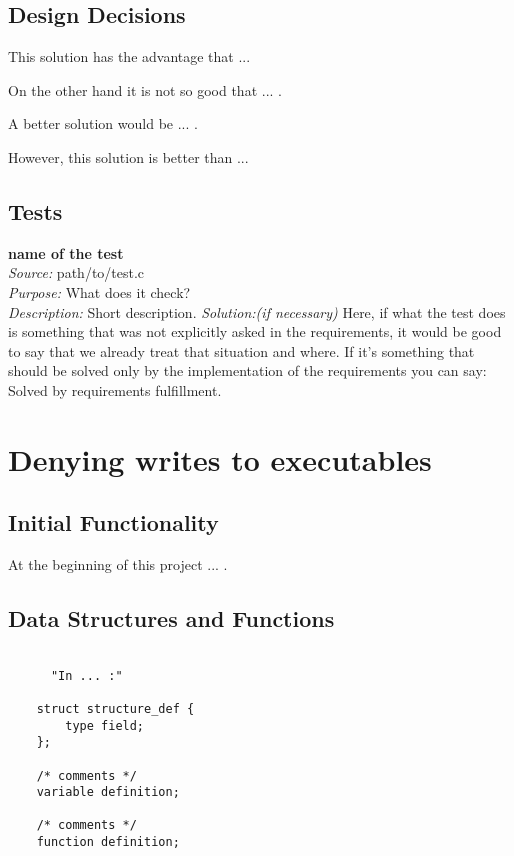     \subsection{Design Decisions}

	This solution has the advantage that ... 

	On the other hand it is not so good that ... . 

	A better solution would be ... . 

	However, this solution is better than ...

    \subsection{Tests}

    \textbf{name of the test}\\
    \textit{Source:} path/to/test.c\\
    \textit{Purpose:} What does it check?\\
    \textit{Description:} Short description.
    \textit{Solution:(if necessary)} Here, if what the test does is something that was not explicitly asked in the requirements, it would be good to say that we already treat that situation and where. If it's something that should be solved only by the implementation of the requirements you can say: Solved by requirements fulfillment.
	

\section{Denying writes to executables}

     \subsection{Initial Functionality}

	At the beginning of this project ... .

    \subsection{Data Structures and Functions}

    \begin{lstlisting}

      "In ... :"
	
	struct structure_def {
	    type field;
	};

	/* comments */
	variable definition;

	/* comments */
	function definition;

    \end{lstlisting}



